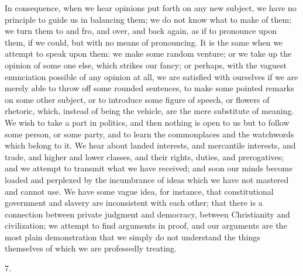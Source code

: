 In consequence, when we hear opinions put forth on any new subject,
we have no principle to guide us in balancing them; we do not know
what to make of them; we turn them to and fro, and over, and back
again, as if to pronounce upon them, if we could, but with no means of
pronouncing. It is the same when we attempt to speak upon them: we
make some random venture; or we take up the opinion of some one else,
which strikes our fancy; or perhaps, with the vaguest enunciation
possible of any opinion at all, we are satisfied with ourselves if we
are merely able to throw off some rounded sentences, to make some
pointed remarks on some other subject, or to introduce some figure of
speech, or flowers of rhetoric, which, instead of being the vehicle,
are the mere substitute of meaning. We wish to take a part in
politics, and then nothing is open to us but to follow some person, or
some party, and to learn the commonplaces and the watchwords which
belong to it. We hear about landed interests, and mercantile
interests, and trade, and higher and lower classes, and their rights,
duties, and prerogatives; and we attempt to transmit what we have
received; and soon our minds become loaded and perplexed by the
incumbrance of ideas which we have not mastered and cannot use. We
have some vague idea, for instance, that constitutional government and
slavery are inconsistent with each other; that there is a connection
between private judgment and democracy, between Christianity and
civilization; we attempt to find arguments in proof, and our arguments
are the most plain demonstration that we simply do not understand the
things themselves of which we are professedly treating.

7.

